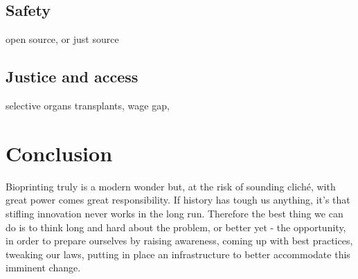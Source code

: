\documentclass[12pt]{article} %
\begin{document}
\subsection{Safety} %
open source, or just source


\subsection{Justice and access} %
selective organs transplants,
wage gap,


\newpage 


\section{Conclusion} %

Bioprinting truly is a modern wonder but, at the risk of sounding cliché, with great power comes great responsibility. If history has tough us anything, it's that stifling innovation never works in the long run. Therefore the best thing we can do is to think long and hard about the problem, or better yet - the opportunity, in order to prepare ourselves by raising awareness, coming up with best practices, tweaking our laws, putting in place an infrastructure to better accommodate this imminent change.

\newpage

\end{document}
